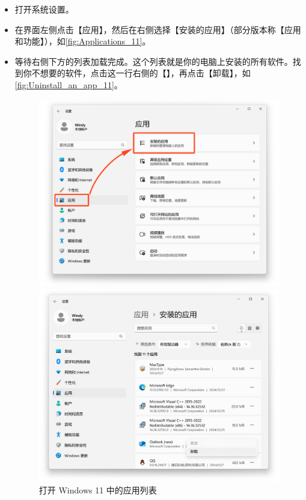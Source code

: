 \begin{itemize}
  \item 打开系统设置。
  \item 在界面左侧点击【应用】，然后在右侧选择【安装的应用】（部分版本称【应用和功能】），如\autoref{fig:Applications_11}。
  \item 等待右侧下方的列表加载完成。这个列表就是你的电脑上安装的所有软件。找到你不想要的软件，点击这一行右侧的【】，再点击【卸载】，如\autoref{fig:Uninstall_an_app_11}。
    \begin{figure}[htb!]
      \centering
      \begin{minipage}{.49\textwidth}
        \centering
        \includegraphics[width=\textwidth]{assets/basic/Applications_11.png}
        \caption{打开 Windows 11 中的应用列表}
        \label{fig:Applications_11}
      \end{minipage}
        \begin{minipage}{.49\textwidth}
        \centering
        \includegraphics[width=\textwidth]{assets/basic/Uninstall_an_app_11.png}

\end{minipage}
\end{figure}
\end{itemize}
